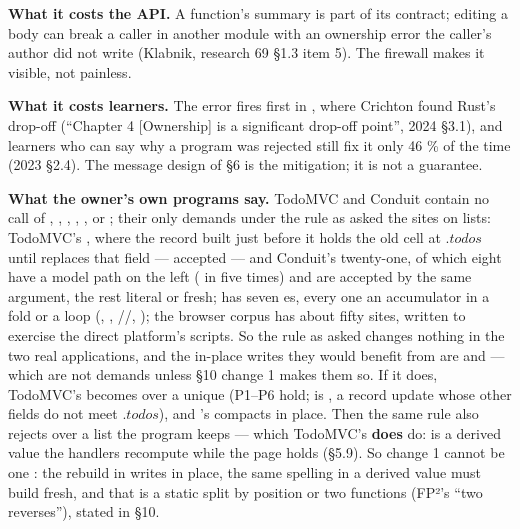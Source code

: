 \textbf{What it costs the API.} A  function's summary is part of its contract; editing a body can break a caller in another module with an ownership error the caller's author did not write (Klabnik, research 69 §1.3 item 5). The firewall makes it visible, not painless.

\textbf{What it costs learners.} The error fires first in , where Crichton found Rust's drop-off (“Chapter 4 [Ownership] is a significant drop-off point”, 2024 §3.1), and learners who can say why a program was rejected still fix it only 46 \% of the time (2023 §2.4). The message design of §6 is the mitigation; it is not a guarantee.

\textbf{What the owner's own programs say.} TodoMVC and Conduit contain no call of , , , , ,  or ; their only demands under the rule as asked the \code{++} sites on lists: TodoMVC's , where the record built just before it holds the old cell at $.\mathit{todos}$ until  replaces that field — accepted — and Conduit's twenty-one, of which eight have a model path on the left ( in  five times) and are accepted by the same argument, the rest literal or fresh;  has seven es, every one an accumulator in a fold or a loop (, , //, ); the browser corpus has about fifty sites, written to exercise the direct platform's scripts. So the rule as asked changes nothing in the two real applications, and the in-place writes they would benefit from are  and  — which are not demands unless §10 change 1 makes them so. If it does, TodoMVC's  becomes  over a unique  (P1–P6 hold;  is , a record update whose other fields do not meet $.\mathit{todos}$), and 's  compacts in place. Then the same rule also rejects  over a list the program keeps — which TodoMVC's  \textbf{does} do:  is a derived value the handlers recompute while the page holds  (§5.9). So change 1 cannot be one : the rebuild in  writes in place, the same spelling in a derived value must build fresh, and that is a static split by position or two functions (FP²'s “two reverses”), stated in §10.

